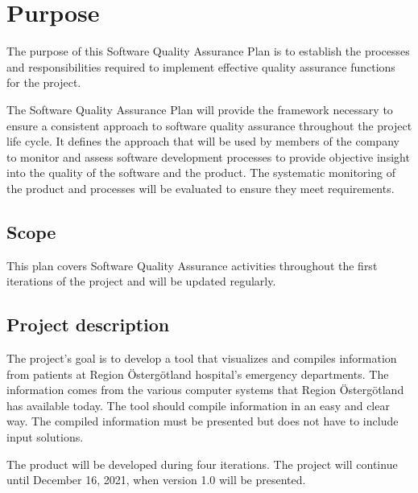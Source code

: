 \section{Purpose}
\label{sec:purpose}

The purpose of this Software Quality Assurance Plan is to establish the processes and responsibilities required to implement effective quality assurance functions for the project.

The Software Quality Assurance Plan will provide the framework necessary to ensure a consistent approach to software quality assurance throughout the project life cycle. It defines the approach that will be used by members of the company to monitor and assess software development processes to provide objective insight into the quality of the software and the product. The systematic monitoring of the product and processes will be evaluated to ensure they meet requirements. 

\subsection{Scope}
This plan covers Software Quality Assurance activities throughout the first iterations of the project and will be updated regularly.

\subsection{Project description}
The project's goal is to develop a tool that visualizes and compiles information from patients at Region Östergötland hospital's emergency departments. The information comes from the various computer systems that Region Östergötland has available today. The tool should compile information in an easy and clear way. The compiled information must be presented but does not have to include input solutions.

The product will be developed during four iterations. The project will continue until December 16, 2021, when version 1.0 will be presented.
